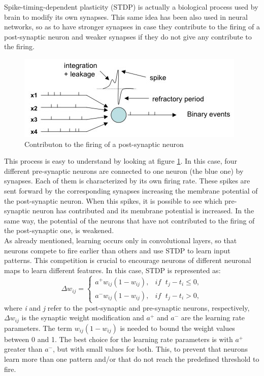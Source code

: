 \documentclass[11pt,a4paper]{scrartcl}
\begin{document}
Spike-timing-dependent plasticity (STDP) is actually a biological process used by brain to modify its own synapses. This same idea has been also used in neural networks, so as to have stronger synapses in case they contribute to the firing of a post-synaptic neuron and weaker synapses if they do not give any contribute to the firing.\\
\begin{figure}[h]
	\centering
	\includegraphics[width=0.75\linewidth]{images/spikes}
	\caption{Contributon to the firing of a post-synaptic neuron}
	\label{fig:spikes}
\end{figure}
This process is easy to understand by looking at figure \ref{fig:spikes}. In this case, four different pre-synaptic neurons are connected to one neuron (the blue one) by synapses. Each of them is characterized by its own firing rate. These spikes are sent forward by the corresponding synapses increasing the membrane potential of the post-synaptic neuron. When this spikes, it is possible to see which pre-synaptic neuron has contributed and its membrane potential is increased. In the same way, the potential of the neurons that have not contributed to the firing of the post-synaptic one, is weakened.\\
As already mentioned, learning occurs only in convolutional layers, so that neurons compete to fire earlier than others and use STDP to learn input patterns. This competition is crucial to encourage neurons of different neuronal maps to learn different features. In this case, STDP is represented as:
\begin{equation*}
	\Delta w_{ij} = \begin{cases}
		a^{+}w_{ij}(1-w_{ij}), & \textit{if }\; t_{j}-t_{i} \leq 0,\\
		a^{-}w_{ij}(1-w_{ij}), & \textit{if }\; t_{j}-t_{i} > 0,
	\end{cases}
\end{equation*}
where \textit{i} and \textit{j} refer to the post-synaptic and pre-synaptic neurons, respectively, $ \Delta w_{ij} $ is the synaptic weight modification and $ a^{+} $ and $ a^{-} $ are the learning rate parameters. The term $ w_{ij}(1-w_{ij}) $ is needed to bound the weight values between 0 and 1. The best choice for the learning rate parameters is with $ a^{+} $ greater than $ a^{-} $, but with small values for both. This, to prevent that neurons learn more than one pattern and/or that do not reach the predefined threshold to fire.\\
\end{document}
